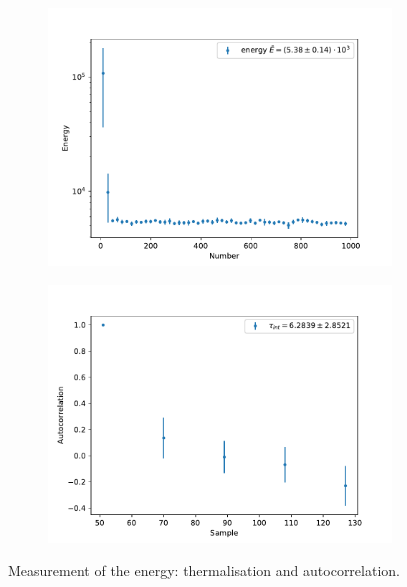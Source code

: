 \documentclass{scrartcl}
\begin{document}
		\begin{figure}[H]
			\centering
				\begin{subfigure}[c]{0.49\textwidth}
					\includegraphics[width=\textwidth]{../imgs/harmonic_oscillator_track/track_10001000_thermalisation_log.pdf}
				\end{subfigure}
				\begin{subfigure}[c]{0.49\textwidth}
					\includegraphics[width=\textwidth]{../imgs/harmonic_oscillator_track/track_10001000_thermalisation_log_autocorrelation.pdf}
				\end{subfigure}
			\caption{Measurement of the energy: thermalisation and autocorrelation.}
			\label{fig:harmonic_oscillator_energy_measurement}
		\end{figure}
\end{document}
